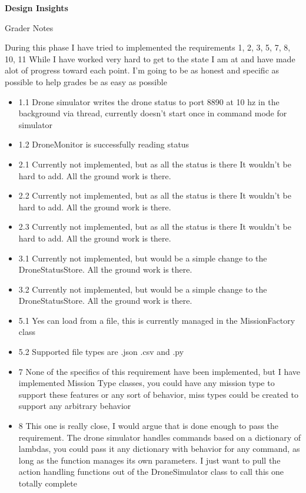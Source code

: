 \documentclass[12pt]{article}
\begin{document}
\begingroup
      \fontsize{14pt}{12pt}\selectfont

      \centerline{\textbf{Design Insights}} \par
\endgroup

Grader Notes

During this phase I have tried to implemented the requirements 1, 2, 3, 5, 7, 8, 10, 11
While I have worked very hard to get to the state I am at and have made alot of progress toward each point.
I'm going to be as honest and specific as possible to help grades be as easy as possible

\begin{itemize}
    \item 1.1 Drone simulator writes the drone status to port 8890 at 10 hz in the background via thread, currently doesn't start once in command mode for simulator
    \item 1.2 DroneMonitor is successfully reading status 
    \item 2.1 Currently not implemented, but as all the status is there It wouldn't be hard to add. All the ground work is there.
    \item 2.2 Currently not implemented, but as all the status is there It wouldn't be hard to add. All the ground work is there.
    \item 2.3 Currently not implemented, but as all the status is there It wouldn't be hard to add. All the ground work is there.
    \item 3.1 Currently not implemented, but would be a simple change to the DroneStatusStore. All the ground work is there.
    \item 3.2 Currently not implemented, but would be a simple change to the DroneStatusStore. All the ground work is there.
    \item 5.1 Yes can load from a file, this is currently managed in the MissionFactory class
    \item 5.2 Supported file types are .json .csv and .py
    \item 7 None of the specifics of this requirement have been implemented, but I have implemented Mission Type classes, you could have any mission type to support these features or any sort of behavior, 
     miss  types could be created to support any arbitrary behavior
    \item 8 This one is really close, I would argue that is done enough to pass the requirement. The drone simulator handles commands based on a dictionary of lambdas, you could pass it any dictionary
    with   behavior for any command, as long as the function manages its own parameters. I just want to pull the action handling functions out of the DroneSimulator class to call this one totally complete

\end{itemize}
\end{document}
